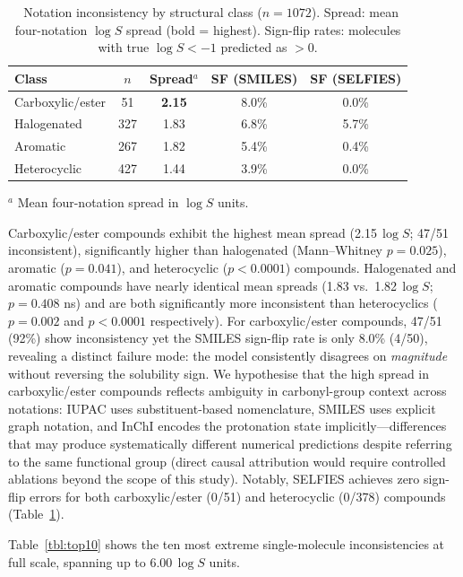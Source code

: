 \documentclass[twoside,twocolumn,9pt]{article}
\newcommand{\logS}{\ensuremath{\log S}}
\begin{document}
\begin{table}[h]
\small
\caption{\ Notation inconsistency by structural class ($n=1072$). Spread: mean four-notation $\logS$ spread (bold = highest). Sign-flip rates: molecules with true $\logS<-1$ predicted as $>0$.}
\label{tbl:class}
\begin{tabular*}{0.48\textwidth}{@{\extracolsep{\fill}}lcccc}
\hline
Class & $n$ & Spread$^a$ & SF (SMILES) & SF (SELFIES) \\
\hline
Carboxylic/ester & 51  & \textbf{2.15} & 8.0\% & 0.0\% \\
Halogenated      & 327 & 1.83 & 6.8\% & 5.7\% \\
Aromatic         & 267 & 1.82 & 5.4\% & 0.4\% \\
Heterocyclic     & 427 & 1.44 & 3.9\% & 0.0\% \\
\hline
\end{tabular*}
$^a$ Mean four-notation spread in $\logS$ units.
\end{table}

Carboxylic/ester compounds exhibit the highest mean spread (2.15\,$\logS$; 47/51 inconsistent), significantly higher than halogenated (Mann--Whitney $p=0.025$), aromatic ($p=0.041$), and heterocyclic ($p<0.0001$) compounds. Halogenated and aromatic compounds have nearly identical mean spreads (1.83 vs.\ 1.82\,$\logS$; $p=0.408$ ns) and are both significantly more inconsistent than heterocyclics ($p=0.002$ and $p<0.0001$ respectively). For carboxylic/ester compounds, 47/51 (92\%) show inconsistency yet the SMILES sign-flip rate is only 8.0\% (4/50), revealing a distinct failure mode: the model consistently disagrees on \textit{magnitude} without reversing the solubility sign. We hypothesise that the high spread in carboxylic/ester compounds reflects ambiguity in carbonyl-group context across notations: IUPAC uses substituent-based nomenclature, SMILES uses explicit graph notation, and InChI encodes the protonation state implicitly---differences that may produce systematically different numerical predictions despite referring to the same functional group (direct causal attribution would require controlled ablations beyond the scope of this study). Notably, SELFIES achieves zero sign-flip errors for both carboxylic/ester (0/51) and heterocyclic (0/378) compounds (Table~\ref{tbl:class}).

Table~\ref{tbl:top10} shows the ten most extreme single-molecule inconsistencies at full scale, spanning up to 6.00\,$\logS$ units.
\end{document}

